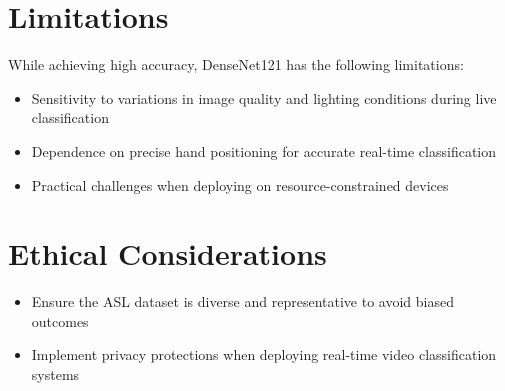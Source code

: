 \documentclass[12pt, a4paper]{article}
\begin{document}
\section{Limitations}
While achieving high accuracy, DenseNet121 has the following limitations:
\begin{itemize}
    \item Sensitivity to variations in image quality and lighting conditions during live classification
    \item Dependence on precise hand positioning for accurate real-time classification
    \item Practical challenges when deploying on resource-constrained devices
\end{itemize}

\section{Ethical Considerations}
\begin{itemize}
    \item Ensure the ASL dataset is diverse and representative to avoid biased outcomes
    \item Implement privacy protections when deploying real-time video classification systems
\end{itemize}



\end{document}

